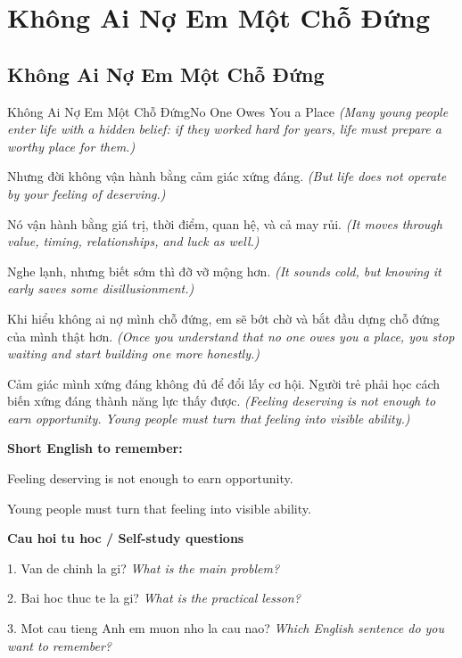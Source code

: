 \chapter{Không Ai Nợ Em Một Chỗ Đứng}

\section{Không Ai Nợ Em Một Chỗ Đứng}
\begin{truyen}{Không Ai Nợ Em Một Chỗ Đứng}{No One Owes You a Place}
\textit{(Many young people enter life with a hidden belief: if they worked hard for years, life must prepare a worthy place for them.)}

Nhưng đời không vận hành bằng cảm giác xứng đáng.
\textit{(But life does not operate by your feeling of deserving.)}

Nó vận hành bằng giá trị, thời điểm, quan hệ, và cả may rủi.
\textit{(It moves through value, timing, relationships, and luck as well.)}

Nghe lạnh, nhưng biết sớm thì đỡ vỡ mộng hơn.
\textit{(It sounds cold, but knowing it early saves some disillusionment.)}

Khi hiểu không ai nợ mình chỗ đứng, em sẽ bớt chờ và bắt đầu dựng chỗ đứng của mình thật hơn.
\textit{(Once you understand that no one owes you a place, you stop waiting and start building one more honestly.)}

\end{truyen}

\begin{baihoc}
Cảm giác mình xứng đáng không đủ để đổi lấy cơ hội. Người trẻ phải học cách biến xứng đáng thành năng lực thấy được.
\textit{(Feeling deserving is not enough to earn opportunity. Young people must turn that feeling into visible ability.)}
\end{baihoc}

\begin{ghinhoanh}
\textbf{Short English to remember:}

Feeling deserving is not enough to earn opportunity.

Young people must turn that feeling into visible ability.

\end{ghinhoanh}

\begin{tuhocnhanh}
\textbf{Cau hoi tu hoc / Self-study questions}

1. Van de chinh la gi? \textit{What is the main problem?}

2. Bai hoc thuc te la gi? \textit{What is the practical lesson?}

3. Mot cau tieng Anh em muon nho la cau nao? \textit{Which English sentence do you want to remember?}
\end{tuhocnhanh}
\ngancach

